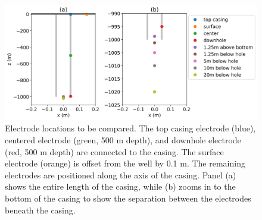 \begin{figure}
    \begin{center}
    \includegraphics[width=\textwidth]{figures/electrode_location.png}
    \end{center}
\caption{
    Electrode locations to be compared. The top casing electrode (blue),
    centered electrode (green, 500 m depth), and downhole electrode (red, 500 m depth)
    are connected to the casing. The surface electrode (orange) is offset from the well
    by 0.1 m. The remaining electrodes are positioned along the axis of the casing. Panel (a)
    shows the entire length of the casing, while (b) zooms in to the bottom of the casing
    to show the separation between the electrodes beneath the casing.
}
\label{fig:electrode_location}
\end{figure}
